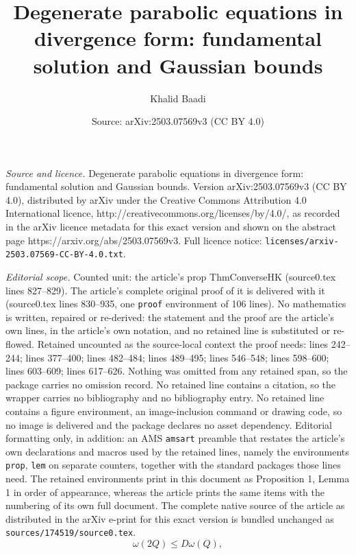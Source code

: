 \documentclass[10pt,a4paper]{amsart}
\title{Degenerate parabolic equations in divergence form: fundamental solution and Gaussian bounds}
\author{Khalid Baadi}
\date{Source: arXiv:2503.07569v3 (CC BY 4.0)}
\begin{document}
\maketitle

\noindent\emph{Source and licence.} Degenerate parabolic equations in divergence form: fundamental solution and Gaussian bounds. Version arXiv:2503.07569v3 (CC BY 4.0), distributed by arXiv under the Creative Commons Attribution 4.0 International licence, http://creativecommons.org/licenses/by/4.0/, as recorded in the arXiv licence metadata for this exact version and shown on the abstract page https://arxiv.org/abs/2503.07569v3. Full licence notice: \texttt{licenses/arxiv-2503.07569-CC-BY-4.0.txt}.\par\smallskip

\noindent\textit{Editorial scope.} Counted unit: the article's prop ThmConverseHK (source0.tex lines 827--829). The article's complete original proof of it is delivered with it (source0.tex lines 830--935, one \texttt{proof} environment of 106 lines). No mathematics is written, repaired or re-derived: the statement and the proof are the article's own lines, in the article's own notation, and no retained line is substituted or re-flowed.  Retained uncounted as the source-local context the proof needs: lines 242--244; lines 377--400; lines 482--484; lines 489--495; lines 546--548; lines 598--600; lines 603--609; lines 617--626.  Nothing was omitted from any retained span, so the package carries no omission record.  No retained line contains a citation, so the wrapper carries no bibliography and no bibliography entry.  No retained line contains a figure environment, an image-inclusion command or drawing code, so no image is delivered and the package declares no asset dependency.  Editorial formatting only, in addition: an AMS \texttt{amsart} preamble that restates the article's own declarations and macros used by the retained lines, namely the environments \texttt{prop}, \texttt{lem} on separate counters, together with the standard packages those lines need.  The retained environments print in this document as Proposition 1, Lemma 1 in order of appearance, whereas the article prints the same items with the numbering of its own full document.  The complete native source of the article as distributed in the arXiv e-print for this exact version is bundled unchanged as \texttt{sources/174519/source0.tex}.
\begin{equation}\label{DoublingMuck}
    \omega(2Q)\leq D \omega(Q),
\end{equation}
\end{document}
